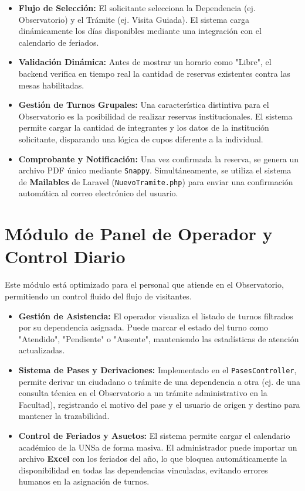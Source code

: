 \begin{itemize}
    \item \textbf{Flujo de Selección:} El solicitante selecciona la Dependencia (ej. Observatorio) y el Trámite (ej. Visita Guiada). El sistema carga dinámicamente los días disponibles mediante una integración con el calendario de feriados.
    \item \textbf{Validación Dinámica:} Antes de mostrar un horario como "Libre", el backend verifica en tiempo real la cantidad de reservas existentes contra las mesas habilitadas. 
    \item \textbf{Gestión de Turnos Grupales:} Una característica distintiva para el Observatorio es la posibilidad de realizar reservas institucionales. El sistema permite cargar la cantidad de integrantes y los datos de la institución solicitante, disparando una lógica de cupos diferente a la individual.
    \item \textbf{Comprobante y Notificación:} Una vez confirmada la reserva, se genera un archivo PDF único mediante \texttt{Snappy}. Simultáneamente, se utiliza el sistema de \textbf{Mailables} de Laravel (\texttt{NuevoTramite.php}) para enviar una confirmación automática al correo electrónico del usuario.
\end{itemize}

\section{Módulo de Panel de Operador y Control Diario}
Este módulo está optimizado para el personal que atiende en el Observatorio, permitiendo un control fluido del flujo de visitantes.

\begin{itemize}
    \item \textbf{Gestión de Asistencia:} El operador visualiza el listado de turnos filtrados por su dependencia asignada. Puede marcar el estado del turno como "Atendido", "Pendiente" o "Ausente", manteniendo las estadísticas de atención actualizadas.
    \item \textbf{Sistema de Pases y Derivaciones:} Implementado en el \texttt{PasesController}, permite derivar un ciudadano o trámite de una dependencia a otra (ej. de una consulta técnica en el Observatorio a un trámite administrativo en la Facultad), registrando el motivo del pase y el usuario de origen y destino para mantener la trazabilidad.
    \item \textbf{Control de Feriados y Asuetos:} El sistema permite cargar el calendario académico de la UNSa de forma masiva. El administrador puede importar un archivo \textbf{Excel} con los feriados del año, lo que bloquea automáticamente la disponibilidad en todas las dependencias vinculadas, evitando errores humanos en la asignación de turnos.
\end{itemize}

